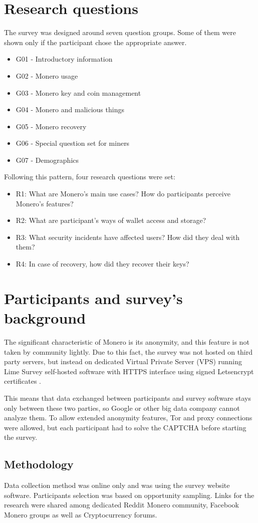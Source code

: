 \documentclass[
  printed, %
  table,   %
  lof,     %
  lot,     %
           oneside, color
]{fithesis3}
\begin{document}
\section{Research questions}
The survey was designed around seven question groups. Some of them were shown only if the participant chose the appropriate answer.
\begin{itemize}\itemsep0em
\item G01 - Introductory information
\item G02 - Monero usage
\item G03 - Monero key and coin management
\item G04 - Monero and malicious things
\item G05 - Monero recovery
\item G06 - Special question set for miners
\item G07 - Demographics
\end{itemize}
Following this pattern, four research questions were set:
\begin{itemize}\itemsep0em
\item R1: What are Monero's main use cases? How do participants perceive Monero's features? 
\item R2: What are participant's ways of wallet access and storage?
\item R3: What security incidents have affected users? How did they deal with them?
\item R4: In case of recovery, how did they recover their keys?
\end{itemize}
\section{Participants and survey's background}
The significant characteristic of Monero is its anonymity, and this feature is not taken by community lightly. Due to this fact, the survey was not hosted on third party servers, but instead on dedicated Virtual Private Server (VPS) running Lime Survey self-hosted software with HTTPS interface using signed Letsencrypt certificates \cite{certbot,limesurvey,letsencrypt}.

This means that data exchanged between participants and survey software stays only between these two parties, so Google or other big data company cannot analyze them. To allow extended anonymity features, Tor and proxy connections were allowed, but each participant had to solve the CAPTCHA before starting the survey.
\subsection{Methodology}
Data collection method was online only and was using the survey website software. Participants selection was based on opportunity sampling. Links for the research were shared among dedicated Reddit Monero community, Facebook Monero groups as well as Cryptocurrency forums.
\end{document}
